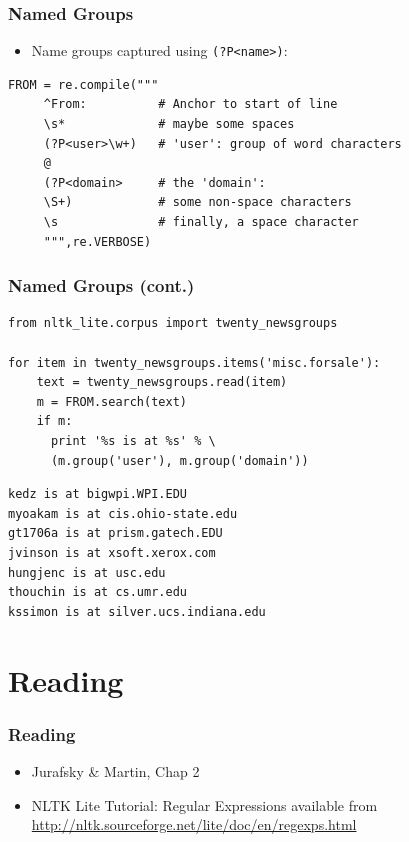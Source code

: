 \begin{frame}[fragile]
\frametitle{Named Groups}

\begin{itemize}[<+->]
\item Name groups captured using \verb!(?P<name>)!:
\end{itemize}
{\small
\begin{verbatim}
FROM = re.compile("""
     ^From:          # Anchor to start of line
     \s*             # maybe some spaces
     (?P<user>\w+)   # 'user': group of word characters 
     @               
     (?P<domain>     # the 'domain':
     \S+)            # some non-space characters
     \s              # finally, a space character
     """,re.VERBOSE)
\end{verbatim}
}
\end{frame}

\begin{frame}[fragile]
\frametitle{Named Groups (cont.)}
{\small
\begin{verbatim}
from nltk_lite.corpus import twenty_newsgroups

for item in twenty_newsgroups.items('misc.forsale'):
    text = twenty_newsgroups.read(item)
    m = FROM.search(text)
    if m:
      print '%s is at %s' % \
      (m.group('user'), m.group('domain'))
\end{verbatim}
}

\begin{verbatim}
kedz is at bigwpi.WPI.EDU
myoakam is at cis.ohio-state.edu
gt1706a is at prism.gatech.EDU
jvinson is at xsoft.xerox.com
hungjenc is at usc.edu
thouchin is at cs.umr.edu
kssimon is at silver.ucs.indiana.edu
\end{verbatim}
\end{frame}

\section{Reading}



\begin{frame}[fragile]
\frametitle{Reading}



\begin{itemize}
  \item {\large Jurafsky \& Martin, Chap 2}
  \item {\large NLTK Lite Tutorial: Regular Expressions}
available from 
\url{http://nltk.sourceforge.net/lite/doc/en/regexps.html}
\end{itemize}


\end{frame}








